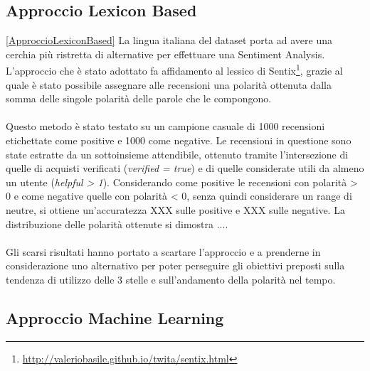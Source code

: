 \subsection{Approccio Lexicon Based}\ref{ApproccioLexiconBased}
La lingua italiana del dataset porta ad avere una cerchia più ristretta di alternative per effettuare una Sentiment Analysis. \\
L'approccio che è stato adottato fa affidamento al lessico di Sentix\footnote{\url{http://valeriobasile.github.io/twita/sentix.html}}, grazie al quale è stato possibile assegnare alle recensioni una polarità ottenuta dalla somma delle singole polarità delle parole che le compongono. %
\\\\
Questo metodo è stato testato su un campione casuale di 1000 recensioni etichettate come positive e 1000 come negative. Le recensioni in questione sono state estratte da un sottoinsieme attendibile, ottenuto tramite l'intersezione di quelle di acquisti verificati (\textit{verified = true}) e di quelle considerate utili da almeno un utente (\textit{helpful > 1}). Considerando come positive le recensioni con polarità > 0 e come negative quelle con polarità < 0, senza quindi considerare un range di neutre, si ottiene un'accuratezza XXX sulle positive e XXX sulle negative. %
La distribuzione delle polarità ottenute si dimostra .... 
\\\\
Gli scarsi risultati hanno portato a scartare l'approccio e a prenderne in considerazione uno alternativo per poter perseguire gli obiettivi preposti sulla tendenza di utilizzo delle 3 stelle e sull'andamento della polarità nel tempo.

\subsection{Approccio Machine Learning}\label{ApproccioMachineLearning}

